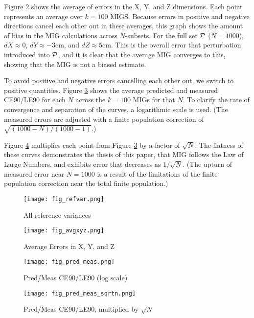 \documentclass{amsart}
\begin{document}
Figure \ref{fig:vanillaxyz} shows the average of errors in the X, Y, and Z
dimensions. Each point represents an average over $k=100$ MIGS. Because errors
in positive and negative directions cancel each other out in these averages,
this graph shows the amount of bias in the MIG calculations across
$N$-subsets. For the full set $\mathcal{P}$ ($N=1000$), $dX\approx 0$, $dY\approx
-3$cm, and $dZ\approx 5$cm. This is the overall error that perturbation
introduced into $\mathcal{P}$, and it is clear that the average MIG converges to this,
showing that the MIG is not a biased estimate.

To avoid positive and negative errors cancelling each other out, we switch to
positive quantities. Figure \ref{fig:vanilla_pred_meas} shows the average
predicted and measured CE90/LE90 for each $N$ across the $k=100$ MIGs for that
$N$. To clarify the rate of convergence and separation of the curves, a
logarithmic scale is used. (The measured errors are adjusted with a finite
population correction of $\sqrt{(1000-N)/(1000-1)}$.)

Figure \ref{fig:vanilla_pred_meas_sqrtn} multiplies each point from Figure
\ref{fig:vanilla_pred_meas} by a factor of $\sqrt N$. The flatness of these
curves demonstrates the thesis of this paper, that MIG follows the Law of Large
Numbers, and exhibits error that decreases as $1/\sqrt N$. (The upturn of
measured error near $N=1000$ is a result of the limitations of the finite
population correction near the total finite population.)


\begin{figure}
\texttt{[image: fig\_refvar.png]}
\caption{\label{fig:vanillaref}All reference variances}
\end{figure}

\begin{figure}
\texttt{[image: fig\_avgxyz.png]}
\caption{\label{fig:vanillaxyz}Average Errors in X, Y, and Z}
\end{figure}

\begin{figure}
\texttt{[image: fig\_pred\_meas.png]}
\caption{\label{fig:vanilla_pred_meas}Pred/Meas CE90/LE90 (log scale)}
\end{figure}

\begin{figure}
\texttt{[image: fig\_pred\_meas\_sqrtn.png]}
\caption{\label{fig:vanilla_pred_meas_sqrtn}Pred/Meas CE90/LE90, multiplied by $\sqrt N$}
\end{figure}
\end{document}
